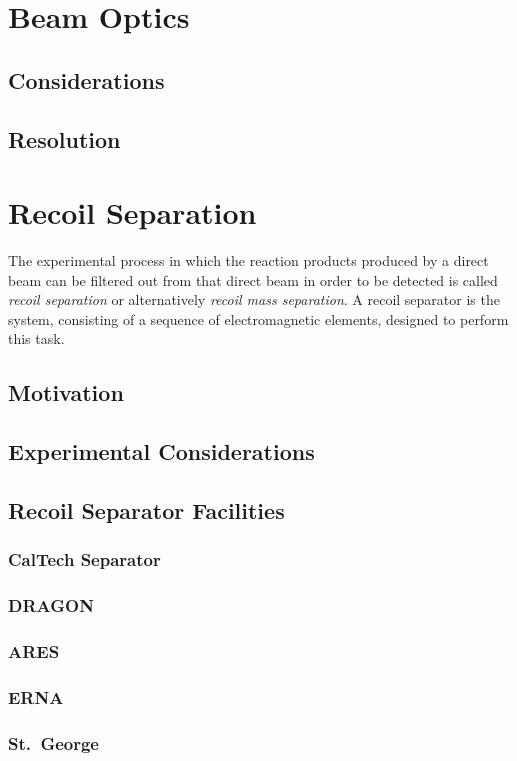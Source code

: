 \section{Beam Optics}
\label{sec:ch01-beam-optics}
\subsection{Considerations}
\subsection{Resolution}


\section{Recoil Separation}
\label{sec:ch01-recoil-separation}

The experimental process in which the reaction products produced by a direct
beam can be filtered out from that direct beam in order to be detected is
called \emph{recoil separation} or alternatively \emph{recoil mass separation}.
A recoil separator is the system, consisting of a sequence of electromagnetic
elements, designed to perform this task.

\subsection{Motivation}
\subsection{Experimental Considerations}
\subsection{Recoil Separator Facilities}
\subsubsection{CalTech Separator}
\subsubsection{DRAGON}
\subsubsection{ARES}
\subsubsection{ERNA}
\subsubsection{St.\ George}
